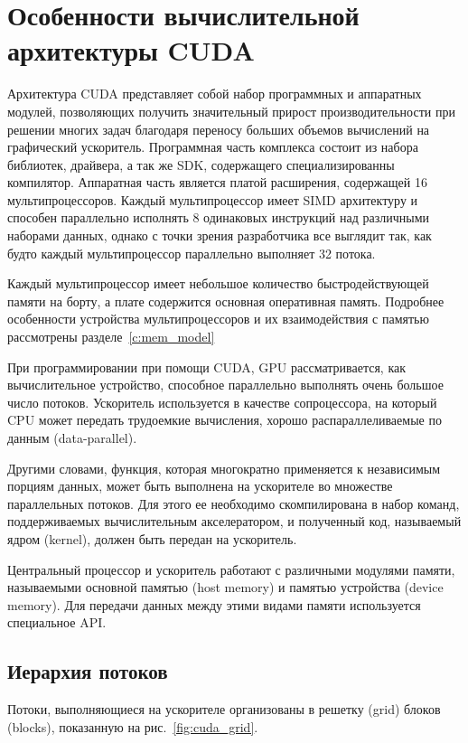 \section{Особенности вычислительной архитектуры CUDA}

Архитектура CUDA представляет собой набор программных и аппаратных модулей, позволяющих получить значительный прирост производительности при решении многих задач благодаря переносу больших объемов вычислений на графический ускоритель. Программная часть комплекса состоит из набора библиотек, драйвера, а так же SDK, содержащего специализированны компилятор. Аппаратная часть является платой расширения, содержащей 16 мультипроцессоров. Каждый мультипроцессор имеет SIMD архитектуру и способен параллельно исполнять 8 одинаковых инструкций над различными наборами данных, однако с точки зрения разработчика все выглядит так, как будто каждый мультипроцессор параллельно выполняет 32 потока. 

Каждый мультипроцессор имеет небольшое количество быстродействующей памяти на борту, а плате содержится основная оперативная память. Подробнее особенности устройства мультипроцессоров и их взаимодействия с памятью рассмотрены разделе~\ref{c:mem_model}

При программировании при помощи CUDA, GPU рассматривается, как вычислительное устройство, способное параллельно выполнять очень большое число потоков. Ускоритель используется в качестве сопроцессора, на который CPU может передать трудоемкие вычисления, хорошо распараллеливаемые по данным (data-parallel).

Другими словами, функция, которая многократно применяется к независимым порциям данных, может быть выполнена на ускорителе во множестве параллельных потоков. Для этого ее необходимо скомпилирована в набор команд, поддерживаемых вычислительным акселератором, и полученный код, называемый ядром (kernel), должен быть передан на ускоритель.

Центральный процессор и ускоритель работают с различными модулями памяти, называемыми основной памятью (host memory) и памятью устройства (device memory). Для передачи данных между этими видами памяти используется специальное API.

\subsection{Иерархия потоков}
Потоки, выполняющиеся на ускорителе организованы в решетку (grid) блоков (blocks), показанную на рис.~\ref{fig:cuda_grid}.

